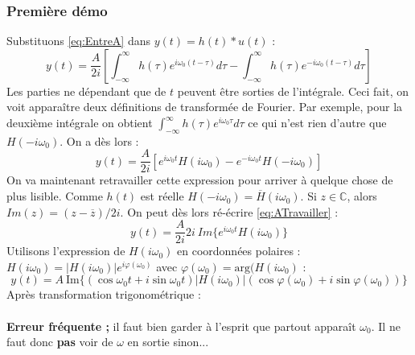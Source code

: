 		\subsubsection{Première démo}
	Substituons \autoref{eq:EntreA} dans $y(t) = h(t)*u(t)$ :
	\begin{equation}
	y(t) = \dfrac{A}{2i}\left[\int_{-\infty}^\infty h(\tau)e^{i\omega_0(t-\tau)}d\tau-
	\int_{-\infty}^\infty h(\tau)e^{-i\omega_0(t-\tau)}d\tau\right]
	\end{equation}
	Les parties ne dépendant que de $t$ peuvent être sorties de l'intégrale. Ceci fait, 
	on voit apparaître deux définitions de transformée de Fourier. Par exemple, pour la 
	deuxième intégrale on obtient $\int_{-\infty}^\infty h(\tau)e^{i\omega_0\tau}d\tau$
	ce qui n'est rien d'autre que $H(-i\omega_0)$. On a dès lors :
	\begin{equation}
	y(t) = \dfrac{A}{2i}\left[e^{i\omega_0t}H(i\omega_0)-e^{-i\omega_0t}H(-i\omega_0)
	\right]
	\label{eq:ATravailler}
	\end{equation}
	On va maintenant retravailler cette expression pour arriver à quelque chose de plus 
	lisible. Comme $h(t)$ est réelle $H(-i\omega_0) = \overline{H}(i\omega_0)$. Si $z\in
	\mathbb{C}$, alors $Im(z) = (z-\overline{z})/2i$. On peut dès lors ré-écrire 
	\autoref{eq:ATravailler} :
	\begin{equation}
	y(t) = \frac{A}{2i}2i\ Im\{e^{i\omega_0t}H(i\omega_0)\}
	\end{equation}
	Utilisons l'expression de $H(i\omega_0)$ en coordonnées polaires : $H(i\omega_0) = 
	|H(i\omega_0)|e^{i\varphi(\omega_0)}$ avec $\varphi(\omega_0) = \text{arg}(H(
	i\omega_0)$ :
	\begin{equation}
	y(t) = A\ \text{Im}\{(\cos\omega_0t + i\sin\omega_0t)|H(i\omega_0)|(\cos\varphi(\omega_0)
	+i\sin\varphi(\omega_0))\}
	\end{equation}
	Après transformation trigonométrique :\\
	
	\ \\	
	\textbf{Erreur fréquente ;} il faut bien garder à l'esprit que partout apparaît $\omega_0$.
	Il ne faut donc \textbf{pas} voir de $\omega$ en sortie sinon...
	
	
